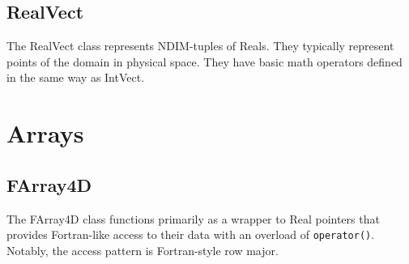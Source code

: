 \documentclass[letterpaper,12pt]{article}
\begin{document}
\subsection{RealVect}

The RealVect class represents NDIM-tuples of Reals. They typically represent points of the domain in physical space. They have basic math operators defined in the same way as IntVect.

\section{Arrays}
\subsection*{FArray4D}

The FArray4D class functions primarily as a wrapper to Real pointers that provides Fortran-like access to their data with an overload of \texttt{operator()}. Notably, the access pattern is Fortran-style row major.
\end{document}
